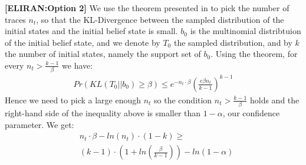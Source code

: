 \documentclass[letterpaper]{article} %
\theoremstyle{definition}
\newcommand{\eliran}[1]{\textbf{[\color{red}ELIRAN:#1]}}
\begin{document}
\eliran{Option 2}
We use the theorem presented in \cite{KLDIV} to pick the number of traces $n_t$, so that the KL-Divergence between the sampled distribution of the initial states and the initial belief state is small. $b_0$ is the multinomial distribtuion of the initial belief state, and we denote by $T_0$ the sampled distribution, and by $k$ the number of initial states, namely the support set of $b_0$. Using the theorem, for every $n_t > \frac{k-1}{\beta}$ we have:
\begin{align*}
    Pr(KL(T_0 || b_0) \geq \beta) \leq e^{-n_t \cdot \beta} \left( \frac{e \beta n_t}{k-1}\right)^{k-1}
\end{align*}
Hence we need to pick a large enough $n_t$ so the condition $n_t > \frac{k-1}{\beta}$ holds and the right-hand side of the inequality above is smaller than $1-\alpha$, our confidence parameter. We get:
\begin{align*}
    &n_t \cdot \beta - ln(n_t)\cdot (1-k) \geq \\ &(k-1)\cdot(1+ln(\frac{\beta}{k-1})) -ln(1-\alpha)
\end{align*}

\end{document}
